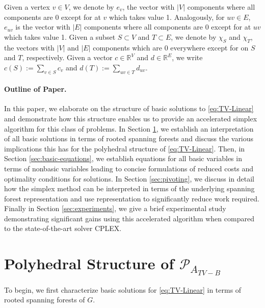\documentclass[titlepage,11pt]{article}
\begin{document}
Given a vertex $v \in V$, we denote by $e_v$, the vector with $|V|$ components where all components are 0 except for at $v$ which takes value 1. Analogously, for $uv \in E$, $e_{uv}$ is the vector with $|E|$ components where all components are 0 except for at ${uv}$ which takes value 1. Given a subset $S \subset V$ and $T \subset E$, we denote by $\chi_S$ and $\chi_T$, the vectors with $|V|$ and $|E|$ components which are 0 everywhere except for on $S$ and $T$, respectively.
Given a vector $c \in \mathbb{R}^V$ and $d \in \mathbb{R}^E$, we write $c(S) := \sum_{v\in S} c_v$ and $d(T) := \sum_{uv \in T} d_{uv}$.

\paragraph{Outline of Paper.}
In this paper, we elaborate on the structure of basic solutions to \eqref{eq:TV-Linear} and demonstrate how this structure enables us to provide an accelerated simplex algorithm for this class of problems. In Section \ref{sec:polyhedron}, we establish an interpretation of all basic solutions in terms of rooted spanning forests and discuss the various implications this has for the polyhedral structure of \eqref{eq:TV-Linear}. Then, in Section \ref{sec:basic-equations}, we establish equations for all basic variables in terms of nonbasic variables leading to concise formulations of reduced costs and optimality conditions for solutions. In Section \ref{sec:pivoting}, we discuss in detail how the simplex method can be interpreted in terms of the underlying spanning forest representation and use representation to significantly reduce work required. Finally in Section \ref{sec:experiments}, we give a brief experimental study demonstrating significant gains using this accelerated algorithm when compared to the state-of-the-art solver CPLEX.

\section{Polyhedral Structure of $\mathcal{P}_{A_{TV-B}}$}\label{sec:polyhedron}

To begin, we first characterize basic solutions for \eqref{eq:TV-Linear} in terms of rooted spanning forests of $G$.
\end{document}
